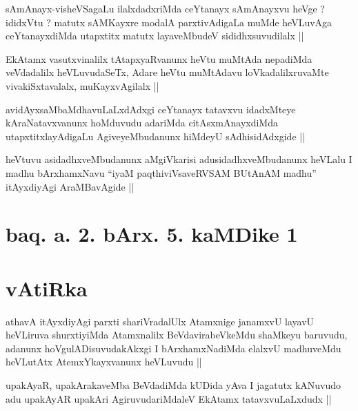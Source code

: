 \begin{artha}
sAmAnayx-visheVSagaLu ilalxdadxriMda ceYtanayx sAmAnayxvu heVge ?
ididxVtu ? matutx sAMKayxre modalA parxtivAdigaLa muMde heVLuvAga
ceYtanayxdiMda utapxtitx matutx layaveMbudeV sididhxsuvudilalx ||
\end{artha}

\begin{artha}
EkAtamx vasutxvinalilx tAtapxyaRvanunx heVtu muMtAda nepadiMda
veVdadalilx heVLuvudaSeTx, Adare heVtu muMtAdavu loVkadalilxruvaMte
vivakiSxtavalalx, muKayxvAgilalx ||
\end{artha}

\begin{artha}
avidAyxsaMbaMdhavuLaLxdAdxgi ceYtanayx tatavxvu idadxMteye
kAraNatavxvanunx hoMduvudu adariMda citAsxmAnayxdiMda
utapxtitxlayAdigaLu AgiveyeMbudanunx hiMdeyU sAdhisidAdxgide ||
\end{artha}


\begin{artha}
heVtuvu asidadhxveMbudanunx aMgiVkarisi adusidadhxveMbudanunx heVLalu
I madhu bArxhamxNavu ``\stext iyaM paqthiviVsaveRVSAM BUtAnAM
madhu'' itAyxdiyAgi AraMBavAgide ||
\end{artha}

\section*{baq. a. 2. bArx. 5. kaMDike 1}

\stext

\section*{vAtiRka}

\begin{artha}
athavA \stext itAyxdiyAgi parxti shariVradalUlx Atamxnige janamxvU
layavU heVLiruva shurxtiyiMda Atamxnalilx BeVdavirabeVkeMdu shaMkeyu
baruvudu, adanunx hoVgulADisuvudakAkxgi I bArxhamxNadiMda elalxvU
madhuveMdu heVLutAtx AtemxYkayxvanunx heVLuvudu ||
\end{artha}


\begin{artha}
upakAyaR, upakArakaveMba BeVdadiMda kUDida yAva I jagatutx kANuvudo
adu upakAyAR upakAri AgiruvudariMdaleV EkAtamx tatavxvuLaLxdudx ||
\end{artha}

